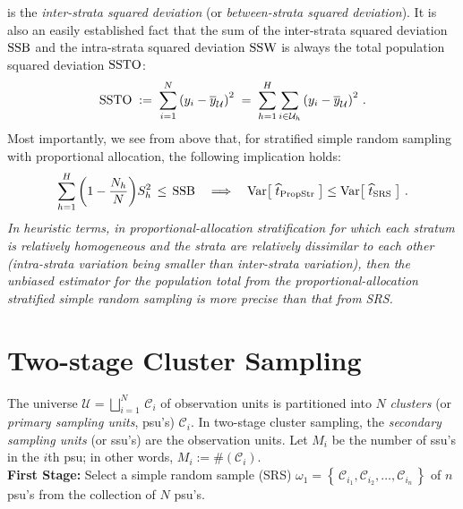 \documentclass{article}
\begin{document}
is the \emph{inter-strata squared deviation} (or \emph{between-strata squared deviation}).  It is also an easily established fact that the sum of the inter-strata squared deviation $\textnormal{SSB}$ and the intra-strata squared deviation $\textnormal{SSW}$ is always the total population squared deviation $\textnormal{SSTO}$:
\begin{equation*}
   \textnormal{SSTO} \; := \; \sum^{N}_{i=1}\left(y_{i}-\overline{y}_{\mathcal{U}}\right)^{2}
   \; = \; \sum^{H}_{h=1}\sum_{i\in\mathcal{U}_{h}}\left(y_{i}-\overline{y}_{\mathcal{U}}\right)^{2}\,.
\end{equation*}
Most importantly, we see from above that, for stratified simple random sampling with proportional allocation, the following implication holds:
\begin{equation*}
\sum_{h=1}^{H}\left(1-\dfrac{N_{h}}{N}\right)\!S^{2}_{h} \,\leq\, \textnormal{SSB}
\quad\Longrightarrow\quad
\textnormal{Var}\!\left[\;\widehat{t}_{\textnormal{PropStr}}\;\right]
\leq
\textnormal{Var}\!\left[\;\widehat{t}_{\textnormal{SRS}}\;\right]\,.
\end{equation*}
\emph{In heuristic terms, in proportional-allocation stratification for which each stratum is relatively homogeneous and the strata are relatively dissimilar to each other (intra-strata variation being smaller than inter-strata variation), then the unbiased estimator for the population total from the proportional-allocation stratified simple random sampling is more precise than that from SRS.
}



\section{Two-stage Cluster Sampling}
\setcounter{theorem}{0}

The universe $\mathcal{U} = \displaystyle{\bigsqcup_{i=1}^{N}}\,\mathcal{C}_{i}$ of observation units is partitioned into $N$ \emph{clusters} (or \emph{primary sampling units}, psu's) $\mathcal{C}_{i}$.  In two-stage cluster sampling, the \emph{secondary sampling units} (or ssu's) are the observation units.  Let $M_{i}$ be the number of ssu's in the $i$th psu; in other words, $M_{i} := \#(\mathcal{C}_{i})$. \\

\noindent
\textbf{First Stage:} \; Select a simple random sample (SRS) $\omega_{1} = \left\{\,\mathcal{C}_{i_{1}},\mathcal{C}_{i_{2}},\ldots,\mathcal{C}_{i_{n}}\,\right\}$ of $n$ psu's from the collection of $N$ psu's. \\
\end{document}
